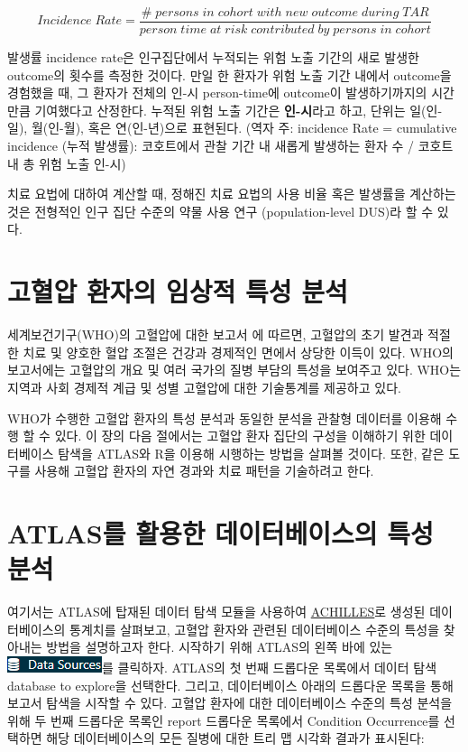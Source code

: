 \documentclass[10.5pt]{book}
\theoremstyle{definition}
\theoremstyle{definition}
\theoremstyle{definition}
\theoremstyle{remark}
\begin{document}
\[
Incidence\;Rate = \frac{\#\;persons\;in\;cohort\;with\;new\;outcome\;during\;TAR}{person\;time\;at\;risk\;contributed\;by\;persons\;in\;cohort}
\]

발생률 incidence rate은 인구집단에서 누적되는 위험 노출 기간의 새로
발생한 outcome의 횟수를 측정한 것이다. 만일 한 환자가 위험 노출 기간
내에서 outcome을 경험했을 때, 그 환자가 전체의 인-시 person-time에
outcome이 발생하기까지의 시간만큼 기여했다고 산정한다. 누적된 위험 노출
기간은 \textbf{인-시}라고 하고, 단위는 일(인-일), 월(인-월), 혹은
연(인-년)으로 표현된다.   (역자
주: incidence Rate = cumulative incidence (누적 발생률): 코호트에서 관찰
기간 내 새롭게 발생하는 환자 수 / 코호트 내 총 위험 노출 인-시)

치료 요법에 대하여 계산할 때, 정해진 치료 요법의 사용 비율 혹은 발생률을
계산하는 것은 전형적인 인구 집단 수준의 약물 사용 연구 (population-level
DUS)라 할 수 있다.

\section{고혈압 환자의 임상적 특성 분석}\label{----}

세계보건기구(WHO)의 고혈압에 대한 보고서 \citep{WHOHypertension} 에
따르면, 고혈압의 초기 발견과 적절한 치료 및 양호한 혈압 조절은 건강과
경제적인 면에서 상당한 이득이 있다. WHO의 보고서에는 고혈압의 개요 및
여러 국가의 질병 부담의 특성을 보여주고 있다. WHO는 지역과 사회 경제적
계급 및 성별 고혈압에 대한 기술통계를 제공하고 있다.

WHO가 수행한 고혈압 환자의 특성 분석과 동일한 분석을 관찰형 데이터를
이용해 수행 할 수 있다. 이 장의 다음 절에서는 고혈압 환자 집단의 구성을
이해하기 위한 데이터베이스 탐색을 ATLAS와 R을 이용해 시행하는 방법을
살펴볼 것이다. 또한, 같은 도구를 사용해 고혈압 환자의 자연 경과와 치료
패턴을 기술하려고 한다.

\section{ATLAS를 활용한 데이터베이스의 특성 분석}\label{atlas----}

여기서는 ATLAS에 탑재된 데이터 탐색 모듈을 사용하여
\href{https://github.com/OHDSI/Achilles}{ACHILLES}로 생성된
데이터베이스의 통계치를 살펴보고, 고혈압 환자와 관련된 데이터베이스
수준의 특성을 찾아내는 방법을 설명하고자 한다. 시작하기 위해 ATLAS의
왼쪽 바에 있는
\includegraphics{images/Characterization/atlasDataSourcesMenuItem.png}를
클릭하자. ATLAS의 첫 번째 드롭다운 목록에서 데이터 탐색 database to
explore을 선택한다. 그리고, 데이터베이스 아래의 드롭다운 목록을 통해
보고서 탐색을 시작할 수 있다. 고혈압 환자에 대한 데이터베이스 수준의
특성 분석을 위해 두 번째 드롭다운 목록인 report 드롭다운 목록에서
Condition Occurrence를 선택하면 해당 데이터베이스의 모든 질병에 대한
트리 맵 시각화 결과가 표시된다:
\end{document}
